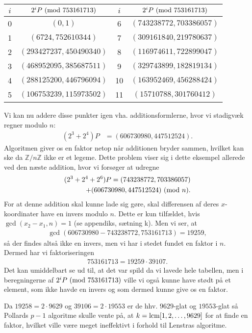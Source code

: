 \begin{example}
\begin{center}
\begin{tabular}{c c c c}
$i$ & $2^i P \ (\mathrm{mod} \ 753161713)$ & $i$ & $2^i P \ (\mathrm{mod} \ 753161713)$ \\ 
\hline 
0 & $(0, 1)$ & 6 & $(743238772, 703386057)$  \\ 
1 & $(6724, 752610344)$ & 7 & $(309161840, 219780637)$  \\ 
2 & $(293427237, 450490340)$ & 8 & $(116974611, 722899047)$ \\ 
3 & $(468952095, 385687511)$ & 9 & $(329743899, 182819134)$ \\ 
4 & $(288125200, 446796094)$ & 10 & $(163952469, 456288424)$ \\ 
5 & $(106753239, 115973502)$ & 11 & $(15710788, 301760412)$
\end{tabular} 
\end{center}
Vi kan nu addere disse punkter igen vha. additionsformlerne, hvor vi stadigvæk regner modulo $n$:
\begin{align*}
	(2^3 + 2^4)P &= (606730980, 447512524). 
\end{align*}
Algoritmen giver os en faktor netop når additionen bryder sammen, hvilket kan ske da $\mathbb{Z}/n \mathbb{Z}$ ikke er et legeme. Dette problem viser sig i dette eksempel allerede ved den næste addition, hvor vi forsøger at udregne
\begin{align*}
	(2^3 + 2^4 + 2^6) P = (743238772, 703386057) \\ + (606730980, 447512524) \ (\mathrm{mod} \ n).
\end{align*}
For at denne addition skal kunne lade sig gøre, skal differensen af deres $x$-koordinater have en invers modulo $n$. Dette er kun tilfældet, hvis $\gcd(x_2 - x_1, n) = 1$ (se appendiks, sætning k). Men vi ser, at
\begin{align*}
	\gcd(606730980 - 743238772, 753161713) = 19259,
\end{align*}
så der findes altså ikke en invers, men vi har i stedet fundet en faktor i $n$. Dermed har vi faktoriseringen
\begin{align*}
	753161713 = 19259 \cdot 39107.
\end{align*}
Det kan umiddelbart se ud til, at det var spild da vi lavede hele tabellen, men i beregningerne af $2^i P \ (\mathrm{mod} \ 753161713)$ ville vi også kunne have stødt på et element, som ikke havde en invers og som dermed kunne give os en faktor.
\end{example}

\begin{remark}
Da $19258 = 2 \cdot 9629$ og $39106 = 2 \cdot 19553$ er de hhv. $9629$-glat og $19553$-glat så Pollards $p-1$ algoritme skulle vente på, at $k = \mathrm{lcm}[1, 2, \ldots, 9629]$ for at finde en faktor, hvilket ville være meget ineffektivt i forhold til Lenstras algoritme.
\end{remark}